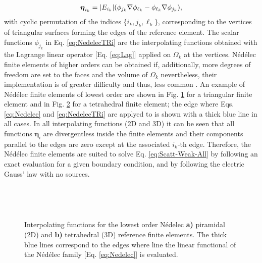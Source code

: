 %
\begin{align}
    \boldsymbol{\eta}_{i_k} = \abs{E_{i_k}} \qty(\phi_{j_k}\nabla\phi_{\ell_k}
                                                    - \phi_{\ell_k}\nabla\phi_{j_k} ),
    \label{eq:NedelecTRi}
\end{align}
%
with cyclic permutation of the indices $\{i_k, j_k, \ell_k\}$, corresponding to the vertices of triangular surfaces forming  the edges of the reference element. The scalar functions $\phi_{j_k}$ in Eq. \eqref{eq:NedelecTRi}  are the interpolating functions obtained with the Lagrange linear operator [Eq. \eqref{eq:Lag}] applied on $\Omega_k$ at the vertices. Nédélec finite elements of higher orders can be obtained if, additionally, more degrees of freedom are set to the faces and the volume of $\Omega_k$ \cite{bergot_generation_2010} nevertheless, their implementation is of greater difficulty and thus, less common \cite{larson_finite_2013,jin_theory_2010}. An example of Nédélec finite elements of lowest order are shown in Fig. \ref{fig:Nedelec:a} for a triangular finite element and in Fig. \ref{fig:Nedelec:b} for a tetrahedral finite element; the edge where Eqs. \eqref{eq:Nedelec} and \eqref{eq:NedelecTRi} are applyed to is shown with a thick blue line in all cases. In all interpolating functions (2D and 3D) it can be seen that all functions $\boldsymbol{\eta}_i$ are divergentless inside the finite elements and their components parallel to the edges are zero except at the associated $i_k$-th edge. Therefore, the Nédélec finite elements are suited to solve Eq. \eqref{eq:Scatt-Weak-All}  by following an exact evaluation for a given boundary condition, and by following the electric Gauss' law with no sources.

\begin{figure}[t!]
    \hspace*{-.7\textwidth}
    \vspace*{7.5em}%
     \begin{subfigure}{\textwidth}\caption{ }\label{fig:Nedelec:a}\end{subfigure}\\
    \hspace*{-.7\textwidth}
     \begin{subfigure}{\textwidth}\caption{ }\label{fig:Nedelec:b}\end{subfigure}
     \vspace*{-11.5em}\\
    \centering
    \scriptsize
    \def\svgwidth{.875\textwidth}
\caption[Piramidal and Tetrahedral Nédélec Finite Element Family of lowest Order]{Interpolating functions for the lowest order Nédelec \textbf{a)} piramidal (2D) and \textbf{b)} tetrahedral (3D) reference finite elements. The thick blue lines correspond to the edges where line the linear functional of the Nédélec family [Eq. \eqref{eq:Nedelec}] is evaluated.}
\label{fig:Nedelec}
\end{figure}
